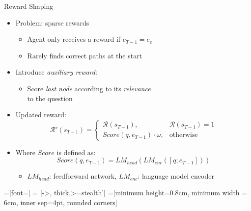 \documentclass[table]{beamer}
\begin{document}
\begin{frame}{Reward Shaping}

\begin{itemize}
    \item Problem: sparse rewards
    \begin{itemize}
      \item Agent only receives a reward if $e_{T-1} = e_e$
      \item Rarely finds correct paths at the start
    \end{itemize}
    \item<2-> Introduce \emph{auxiliary reward}:
    \begin{itemize}
      \item Score \emph{last node} according to its \emph{relevance}\\to the question~{\scriptsize\cite{Yasunaga2021QAGNN}}
    \end{itemize}
    \item<3-> Updated reward:
    \begin{equation*}
      \mathcal{R}'(s_{T-1}) =
        \begin{cases}
          \mathcal{R}(s_{T-1}), & \mathcal{R}(s_{T-1}) = 1 \\
          Score(q, e_{T-1}) \cdot \omega, & \text{otherwise}
        \end{cases}
    \end{equation*}
    \item<3-> Where $Score$ is defined as:
    \begin{equation*}
      Score(q, e_{T-1}) = LM_{head}(LM_{enc}([q;e_{T-1}]))
    \end{equation*}
    \vspace{-0.5cm}
    \begin{itemize}
    \item $LM_{head}$: feedforward network, $LM_{enc}$: language model encoder
    \end{itemize}
\end{itemize}

  \tikzset{>=triangle 45}
  \tikzset{every picture/.style=thick}
  =[font=\small]
   = [->, thick,>=stealth']
  =[minimum height=0.8cm, minimum width = 6cm, inner sep=4pt, rounded corners]


\end{frame}
\end{document}
